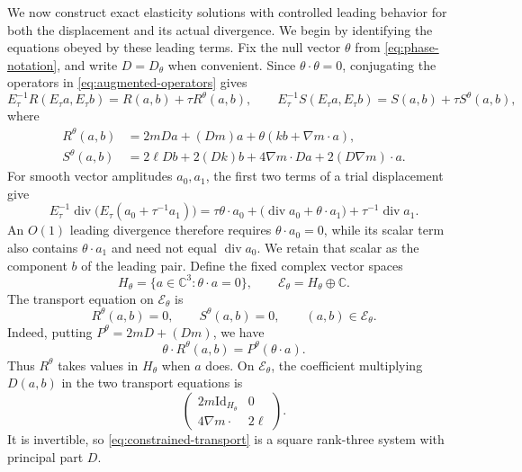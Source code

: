 \documentclass[11pt]{article}
\newcommand{\C}{\mathbb C}
\newcommand{\Id}{\mathrm{Id}}
\DeclareMathOperator{\diverg}{div}
\newcommand{\Ecal}{\mathcal E}
\theoremstyle{remark}
\numberwithin{equation}{section}
\begin{document}
We now construct exact elasticity solutions with controlled leading
behavior for both the displacement and its actual divergence. We begin
by identifying the equations obeyed by these leading terms.
Fix the null vector $\theta$ from \eqref{eq:phase-notation}, and
write $D=D_\theta$ when convenient. Since
$\theta\cdot\theta=0$, conjugating the operators in
\eqref{eq:augmented-operators} gives
\[
 E_\tau^{-1}R(E_\tau a,E_\tau b)=R(a,b)+\tau R^\theta(a,b),
 \qquad
 E_\tau^{-1}S(E_\tau a,E_\tau b)=S(a,b)+\tau S^\theta(a,b),
\]
where
\begin{equation}
\label{eq:leading-operators}
\begin{aligned}
 R^\theta(a,b)
   &=2mDa+(Dm)a+\theta(kb+\nabla m\cdot a),\\
 S^\theta(a,b)
   &=2\ell Db+2(Dk)b+4\nabla m\cdot Da
                       +2(D\nabla m)\cdot a.
\end{aligned}
\end{equation}
For smooth vector amplitudes $a_0,a_1$, the first two terms of a trial
displacement give
\[
 E_\tau^{-1}\diverg\bigl(E_\tau(a_0+\tau^{-1}a_1)\bigr)
 =\tau\theta\cdot a_0+
   \bigl(\diverg a_0+\theta\cdot a_1\bigr)
   +\tau^{-1}\diverg a_1.
\]
An $O(1)$ leading divergence therefore requires $\theta\cdot a_0=0$,
while its scalar term also contains $\theta\cdot a_1$ and need not equal
$\diverg a_0$. We retain that scalar as the component $b$ of the leading
pair.
Define the fixed complex vector spaces
\begin{equation}
\label{eq:constrained-fibers}
 H_\theta=\{a\in\C^3:\theta\cdot a=0\},
 \qquad \Ecal_\theta=H_\theta\oplus\C.
\end{equation}
The transport equation on $\Ecal_\theta$ is
\begin{equation}
\label{eq:constrained-transport}
 R^\theta(a,b)=0,\qquad S^\theta(a,b)=0,
 \qquad (a,b)\in\Ecal_\theta.
\end{equation}
Indeed, putting $P^\theta=2mD+(Dm)$, we have
\begin{equation}
\label{eq:normal-transport-component}
 \theta\cdot R^\theta(a,b)=P^\theta(\theta\cdot a).
\end{equation}
Thus $R^\theta$ takes values in $H_\theta$ when $a$ does. On
$\Ecal_\theta$, the coefficient multiplying $D(a,b)$ in the two
transport equations is
\[
 \begin{pmatrix}
  2m\Id_{H_\theta}&0\\
  4\nabla m\cdot&2\ell
 \end{pmatrix}.
\]
It is invertible, so \eqref{eq:constrained-transport} is a square
rank-three system with principal part $D$.
\end{document}
